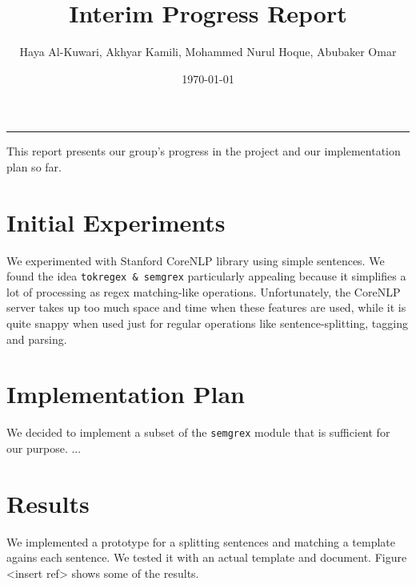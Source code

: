\documentclass{article}
\title{Interim Progress Report}
\author{Haya Al-Kuwari, Akhyar Kamili, Mohammed Nurul Hoque, Abubaker Omar}
\date{\today}
\begin{document}
    \maketitle
    \noindent\rule{\textwidth}{1pt}
    This report presents our group's progress in the project and our implementation plan so far.

    \section{Initial Experiments}
    We experimented with Stanford CoreNLP library using simple sentences. We found the idea
    \texttt{tokregex \& semgrex} particularly appealing because it simplifies a lot of processing as
    regex matching-like operations. Unfortunately, the CoreNLP server takes up too much space and
    time when these features are used, while it is quite snappy when used just for regular
    operations like sentence-splitting, tagging and parsing.

    \section{Implementation Plan}
    We decided to implement a subset of the \texttt{semgrex} module that is sufficient for our purpose. ...

    \section{Results}
    We implemented a prototype for a splitting sentences and matching a template agains each
    sentence. We tested it with an actual template and document. Figure <insert ref> shows some of
    the results.
    
\end{document}

